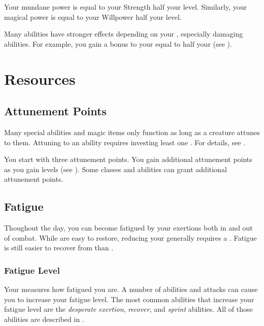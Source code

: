     Your mundane power is equal to your Strength \add half your level.
    Similarly, your magical power is equal to your Willpower \add half your level.

    Many abilities have stronger effects depending on your , especially damaging abilities.
    For example, you gain a bonus to your  equal to half your  (see ).

\section{Resources}\label{Resources}

  \subsection{Attunement Points}\label{Attunement Points}
    Many special abilities and magic items only function as long as a creature attunes to them.
    Attuning to an ability requires investing least one .
    For details, see .

    You start with three attunement points.
    You gain additional attunement points as you gain levels (see ).
    Some classes and abilities can grant additional attunement points.

  \subsection{Fatigue}\label{Fatigue}
    Thoughout the day, you can become fatigued by your exertions both in and out of combat.
    While  are easy to restore, reducing your  generally requires a .
    Fatigue is still easier to recover from than .

    \subsubsection{Fatigue Level}\label{Fatigue Level}
      Your  measures how fatigued you are.
      A number of abilities and attacks can cause you to increase your fatigue level.
      The most common abilities that increase your fatigue level are the \textit{desperate exertion}, \textit{recover}, and \textit{sprint} abilities.
      All of those abilities are described in .

